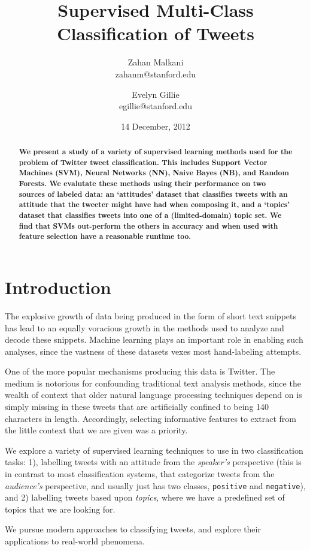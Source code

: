 \documentclass[fontsize=10pt,twocolumn,letterpaper,abstracton]{scrartcl}
\title{Supervised Multi-Class Classification of Tweets}
\author{Zahan Malkani\\zahanm@stanford.edu \and Evelyn Gillie
  \\ egillie@stanford.edu}
\date{14 December, 2012}
\begin{document}
\maketitle

\begin{abstract}
  \textbf{We present a study of a variety of supervised learning methods used for the problem of Twitter tweet classification. This includes Support Vector Machines (SVM), Neural Networks (NN), Naive Bayes (NB), and Random Forests.  We evalutate these methods using their performance on two sources of labeled data: an `attitudes' dataset that classifies tweets with an attitude that the tweeter might have had when composing it, and a `topics' dataset that classifies tweets into one of a (limited-domain) topic set. We find that SVMs out-perform the others in accuracy and when used with feature selection have a reasonable runtime too.}
\end{abstract}

\section{Introduction}

The explosive growth of data being produced in the form of short text snippets has lead to an equally voracious growth in the methods used to analyze and decode these snippets. Machine learning plays an important role in enabling such analyses, since the vastness of these datasets vexes most hand-labeling attempts.

One of the more popular mechanisms producing this data is Twitter. The medium is notorious for confounding traditional text analysis methods, since the wealth of context that older natural language processing techniques depend on is simply missing in these tweets that are artificially confined to being 140 characters in length. Accordingly, selecting informative features to extract from the little context that we are given was a priority.

We explore a variety of supervised learning techniques to use in two classification tasks: 1), labelling tweets with an attitude from the \emph{speaker's} perspective (this is in contrast to most classification systems, that categorize tweets from the \emph{audience's} perspective, and usually just has two classes, \verb|positive| and \verb|negative|), and 2) labelling tweets based upon \emph{topics}, where we have a predefined set of topics that we are looking for.

We pursue modern approaches to classifying tweets, and explore their applications to real-world phenomena.
\end{document}
